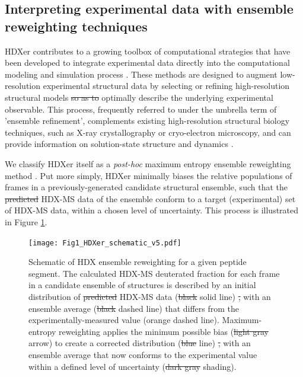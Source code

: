 \documentclass[9pt,tutorial]{livecoms}
\providecommand{\DIFadd}[1]{{\protect\color{blue}\uwave{#1}}} %
\providecommand{\DIFdel}[1]{{\protect\color{red}\sout{#1}}}                      %
\providecommand{\DIFaddbegin}{} %
\providecommand{\DIFaddend}{} %
\providecommand{\DIFdelbegin}{} %
\providecommand{\DIFdelend}{} %
\providecommand{\DIFaddFL}[1]{\DIFadd{#1}} %
\providecommand{\DIFdelFL}[1]{\DIFdel{#1}} %
\providecommand{\DIFaddbeginFL}{} %
\providecommand{\DIFaddendFL}{} %
\providecommand{\DIFdelbeginFL}{} %
\providecommand{\DIFdelendFL}{} %
\begin{document}
\DIFaddend \subsection{Interpreting experimental data with ensemble reweighting techniques}\label{interpretingexptdata_sect}

HDXer contributes to a growing toolbox of computational strategies that have been developed to integrate experimental data directly into the computational modeling and simulation process \cite{Bonomi2017, Kofinger2019, Orioli2020}.
These methods are designed to augment low-resolution experimental structural data by selecting or refining high-resolution structural models \DIFdelbegin \DIFdel{so as to }\DIFdelend \DIFaddbegin \DIFadd{that }\DIFaddend optimally describe the underlying experimental observable.
This process, frequently referred to under the umbrella term of 'ensemble refinement', complements existing high-resolution structural biology techniques, such as X-ray crystallography or cryo-electron microscopy, and can provide information on solution-state structure and dynamics \cite{Rozycki2011, Marinelli2015, Marinelli2019, Bottaro2018, Bengtsen2020, Cesari2016, Hustedt2018, Kofinger2019}.

We classify HDXer itself as a \textit{post-hoc} maximum entropy ensemble reweighting method \cite{Pitera2012, Boomsma2014}. 
Put more simply, HDXer minimally biases the relative populations of frames in a previously-generated candidate structural ensemble, such that the \DIFdelbegin \DIFdel{predicted }\DIFdelend \DIFaddbegin \DIFadd{calculated }\DIFaddend HDX-MS data of the ensemble conform to a target (experimental) set of HDX-MS data, within a chosen level of uncertainty.
This process is illustrated in Figure \ref{fig:reweightingschematic}.
\begin{figure}
    \DIFdelbeginFL %
\DIFdelendFL \DIFaddbeginFL \texttt{[image: Fig1\_HDXer\_schematic\_v5.pdf]}
    \DIFaddendFL \caption{Schematic of HDX ensemble reweighting for a given peptide segment. The calculated HDX-MS deuterated fraction for each frame in a candidate ensemble of structures is described by an initial distribution of \DIFdelbeginFL \DIFdelFL{predicted }\DIFdelendFL \DIFaddbeginFL \DIFaddFL{calculated }\DIFaddendFL HDX-MS data (\DIFdelbeginFL \DIFdelFL{black }\DIFdelendFL solid \DIFaddbeginFL \DIFaddFL{black }\DIFaddendFL line) \DIFdelbeginFL \DIFdelFL{, }\DIFdelendFL with an ensemble average (\DIFdelbeginFL \DIFdelFL{black }\DIFdelendFL dashed \DIFaddbeginFL \DIFaddFL{black }\DIFaddendFL line) that differs from the experimentally-measured value (orange dashed line). Maximum-entropy reweighting applies the minimum possible bias (\DIFdelbeginFL \DIFdelFL{light gray }\DIFdelendFL arrow) to create a corrected distribution (\DIFdelbeginFL \DIFdelFL{blue }\DIFdelendFL \DIFaddbeginFL \DIFaddFL{cyan }\DIFaddendFL line) \DIFdelbeginFL \DIFdelFL{, }\DIFdelendFL with an ensemble average that now conforms to the experimental value within a defined level of uncertainty (\DIFdelbeginFL \DIFdelFL{dark gray }\DIFdelendFL shading).}
    \label{fig:reweightingschematic}
\end{figure}
\end{document}
